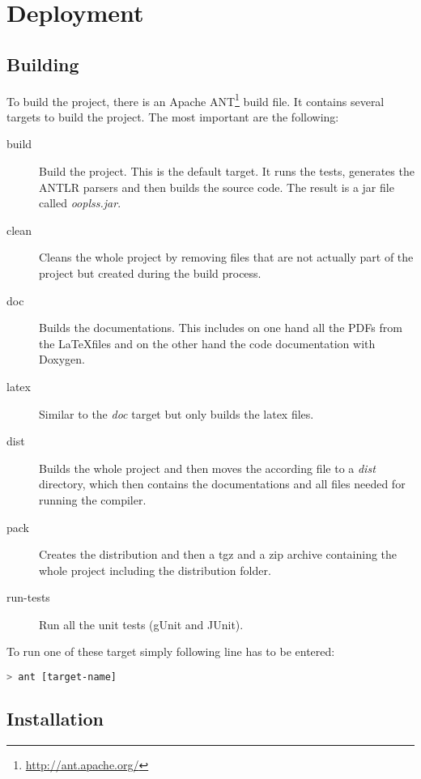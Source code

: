 \chapter{Deployment}

\section{Building}

To build the project, there is an Apache ANT\footnote{\href{http://ant.apache.org/}{http://ant.apache.org/}}
build file. It contains several targets to build the project.
The most important are the following: 

\begin{description}
\item[build] Build the project. This is the default target. It runs
the tests, generates the ANTLR parsers and then builds the source
code. The result is a jar file called \emph{ooplss.jar}.
\item[clean] Cleans the whole project by removing files that are not
actually part of the project but created during the build process.
\item[doc] Builds the documentations. This includes on one hand all
the PDFs from the \LaTeX files and on the other hand the code
documentation with Doxygen.
\item[latex] Similar to the \emph{doc} target but only builds the
latex files.
\item[dist] Builds the whole project and then moves the
according file to a \emph{dist} directory, which then
contains the documentations and all files needed for running the compiler.
\item[pack] Creates the distribution and then a tgz and a zip archive containing
the whole project including the distribution folder.
\item[run-tests] Run all the unit tests (gUnit and JUnit).
\end{description}

To run one of these target simply following line has to be entered:
\begin{lstlisting}[numbers=none,language=bash,caption=Running the ant build system]
> ant [target-name]
\end{lstlisting}

\section{Installation}

